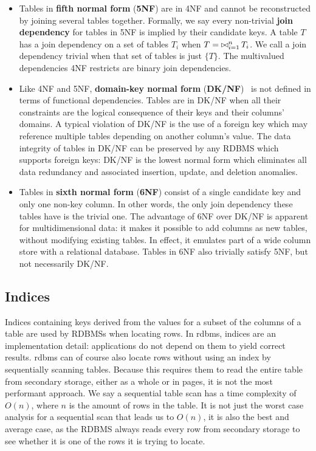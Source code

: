 \begin{itemize}
\item Tables in \textbf{fifth normal form} (\textbf{5NF}) are in 4NF and cannot be reconstructed by joining several tables together. Formally, we say every non-trivial \textbf{join dependency} for tables in 5NF is implied by their candidate keys. A table \(T\) has a join dependency on a set of tables \(T_i\) when \(T = \operatorname*{\bowtie}_{i=1}^{n} T_i\). We call a join dependency trivial when that set of tables is just \(\{ T \}\). The multivalued dependencies 4NF restricts are binary join dependencies.
\item Like 4NF and 5NF, \textbf{domain-key normal form} (\textbf{DK/NF})~\citep{DBLP:journals/tods/Fagin81} is not defined in terms of functional dependencies. Tables are in DK/NF when all their constraints are the logical consequence of their keys and their columns' domains. A typical violation of DK/NF is the use of a foreign key which may reference multiple tables depending on another column's value. The data integrity of tables in DK/NF can be preserved by any RDBMS which supports foreign keys\thinspace: DK/NF is the lowest normal form which eliminates all data redundancy and associated insertion, update, and deletion anomalies.
\item Tables in \textbf{sixth normal form} (\textbf{6NF}) consist of a single candidate key and only one non-key column. In other words, the only join dependency these tables have is the trivial one. The advantage of 6NF over DK/NF is apparent for multidimensional data: it makes it possible to add columns as new tables, without modifying existing tables. In effect, it emulates part of a wide column store with a relational database. Tables in 6NF also trivially satisfy 5NF, but not necessarily DK/NF.
\end{itemize}

\subsection{Indices}%

Indices containing keys derived from the values for a subset of the columns of a table are used by RDBMSs when locating rows.
In \acrshort{rdbms}, indices are an implementation detail\thinspace: applications do not depend on them to yield correct results.
\Acrshort{rdbms} can of course also locate rows without using an index by sequentially scanning tables.
Because this requires them to read the entire table from secondary storage, either as a whole or in pages, it is not the most performant approach.
We say a sequential table scan has a time complexity of \(O(n)\), where \(n\) is the amount of rows in the table.
It is not just the worst case analysis for a sequential scan that leads us to \(O(n)\), it is also the best and average case, as the RDBMS always reads every row from secondary storage to see whether it is one of the rows it is trying to locate.

